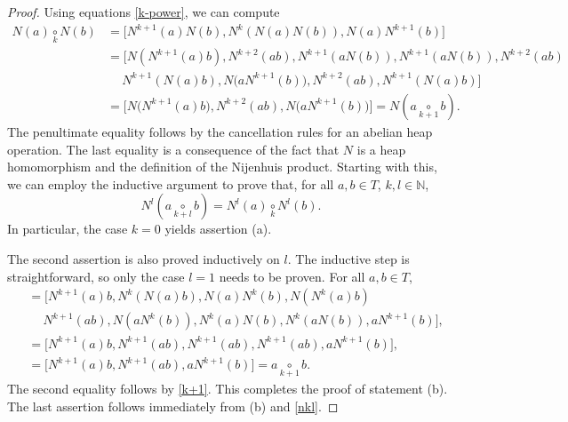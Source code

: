 \documentclass[10pt,a4paper]{amsart}
\numberwithin{equation}{section}
\newcommand{\N}{\mathbb N}
\def\nij#1{{\underset{#1}{\circ}}}
\begin{document}
\begin{proof}
Using equations \eqref{k-power}, we can compute
\begin{align*}
 N(a)\nij k N(b) &= \big[N^{k+1}(a)N(b), N^{k}(N(a)N(b)), N(a)N^{k+1}(b)\big]\\
 &= \big[N(N^{k+1}(a)b),N^{k+2}(ab),N^{k+1}(aN(b)),N^{k+1}(aN(b)), N^{k+2}(ab)\\
 &\quad\ N^{k+1}(N(a)b),N\big(aN^{k+1}(b)\big),N^{k+2}(ab),N^{k+1}(N(a)b) \big]\\
 &= \big[N\big(N^{k+1}(a)b\big), N^{k+2}(ab),N\big(aN^{k+1}(b)\big) \big]
 = N(a\nij{k+1}b).
\end{align*}
The penultimate equality follows by the cancellation rules for an abelian heap operation. The last equality is a consequence of the fact that $N$ is a heap homomorphism and the definition of the Nijenhuis product. Starting with this, we can employ the inductive argument to prove that, for all $a,b\in T$, $k,l\in \N$,
\begin{equation}\label{nkl}
N^l(a\nij{k+l} b) = N^l(a)\nij k N^l(b).
\end{equation}
In particular, the case $k=0$ yields assertion (a).

The second assertion is also proved inductively on $l$. The inductive step is straightforward, so only the case $l=1$ needs to be proven. For all $a,b\in T$,
\begin{align*}
 [N(a)\nij k b, N(a\nij k b), a\nij k N(b)] &= \big[N^{k+1}(a)b, N^k(N(a)b), N(a)N^k(b),N(N^k(a)b)\\
 &\quad\ N^{k+1}(ab), N(aN^k(b)), N^k(a)N(b), N^k(aN(b)), aN^{k+1}(b)\big],\\
 &= \big[N^{k+1}(a)b, N^{k+1}(ab), N^{k+1}(ab),N^{k+1}(ab), aN^{k+1}(b)\big], \\
 &= \big[N^{k+1}(a)b,N^{k+1}(ab), aN^{k+1}(b)\big] = a\nij{k+1}b.
\end{align*}
The second equality follows by \eqref{k+1}. This completes the proof of statement (b). The last assertion follows immediately from (b) and \eqref{nkl}.
\end{proof}
\end{document}
